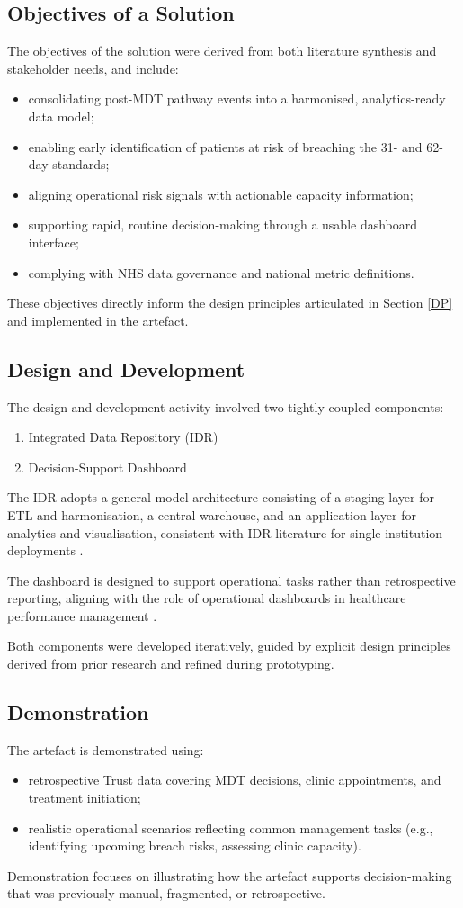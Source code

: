 \subsection{Objectives of a Solution}
The objectives of the solution were derived from both literature synthesis and stakeholder needs, and include:
\begin{itemize}
    \item consolidating post-MDT pathway events into a harmonised, analytics-ready data model;
    \item enabling early identification of patients at risk of breaching the 31- and 62-day standards;
    \item aligning operational risk signals with actionable capacity information;
    \item supporting rapid, routine decision-making through a usable dashboard interface;
    \item complying with NHS data governance and national metric definitions.
\end{itemize}
These objectives directly inform the design principles articulated in Section \ref{DP} and implemented in the artefact.

\subsection{Design and Development}
The design and development activity involved two tightly coupled components:
\begin{enumerate}
    \item Integrated Data Repository (IDR)
    \item Decision-Support Dashboard
\end{enumerate}
The IDR adopts a general-model architecture consisting of a staging layer for ETL and harmonisation, a central warehouse, and an application layer for analytics and visualisation, consistent with IDR literature for single-institution deployments \citep{gagalova2020}.

The dashboard is designed to support operational tasks rather than retrospective reporting, aligning with the role of operational dashboards in healthcare performance management \citep{buttigieg2017}. 

Both components were developed iteratively, guided by explicit design principles derived from prior research and refined during prototyping. 

\subsection{Demonstration}
The artefact is demonstrated using:
\begin{itemize}
    \item retrospective Trust data covering MDT decisions, clinic appointments, and treatment initiation;
    \item realistic operational scenarios reflecting common management tasks (e.g., identifying upcoming breach risks, assessing clinic capacity).
\end{itemize}
Demonstration focuses on illustrating how the artefact supports decision-making that was previously manual, fragmented, or retrospective.

